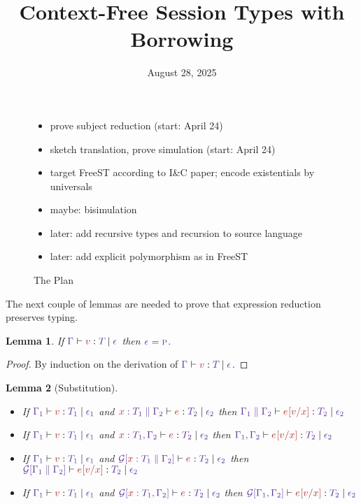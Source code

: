 \documentclass{article}
\title{Context-Free Session Types with Borrowing}
\date{August 28, 2025}
\newtheorem{lemma}{Lemma}
\begin{document}
\maketitle

\begin{figure}[tp]
  \begin{itemize}
  \item prove subject reduction (start: April 24)
  \item sketch translation, prove simulation (start: April 24)
  \item target FreeST according to I\&C paper; encode existentials by
    universals
  \item maybe: bisimulation
  \item later: add recursive types and recursion to source language
  \item later: add explicit polymorphism as in FreeST
  \end{itemize}
  \caption{The Plan}
  \label{fig:the-plan}
\end{figure}


The next couple of lemmas are needed to prove that
expression reduction preserves typing.

\begin{lemma}
  If $\HasType {\Ctx} {\V} {\T} {\Eff}$
  then $\Eff = \EffPure$.
\end{lemma}
\begin{proof}
  By induction on the derivation of $\HasType {\Ctx} {\V} {\T} {\Eff}$.
\end{proof}

\begin{lemma}[Substitution]\
  \begin{itemize}
    \item If $\HasType {\Ctx[1]} {\V} {\T[1]} {\Eff[1]}$ and
    $\HasType {\CtxExtUnord{\CtxVar x{\T[1]}}{\Ctx[2]}} {\E} {\T[2]} {\Eff[2]}$
    then 
    $\HasType {\CtxExtUnord{\Ctx[1]}{\Ctx[2]}} {\Subs\E\V x} {\T[2]} {\Eff[2]}$
    \item If $\HasType {\Ctx[1]} {\V} {\T[1]} {\Eff[1]}$ and
    $\HasType {\CtxExt{\CtxVar x{\T[1]}}{\Ctx[2]}} {\E} {\T[2]} {\Eff[2]}$
    then 
    $\HasType {\CtxExt{\Ctx[1]}{\Ctx[2]}} {\Subs\E\V x} {\T[2]} {\Eff[2]}$
    \item If $\HasType {\Ctx[1]} {\V} {\T[1]} {\Eff[1]}$
    and
    $\HasType
    {\CtxPattern{\CtxExtUnord{\CtxVar x{\T[1]}}{\Ctx[2]}}}
    {\E}
    {\T[2]}
    {\Eff[2]}$ then 
    $\HasType {\CtxPattern{\CtxExtUnord{\Ctx[1]}{\Ctx[2]}}} {\Subs\E\V x} {\T[2]} {\Eff[2]}$
  \item If $\HasType {\Ctx[1]} {\V} {\T[1]} {\Eff[1]}$
    and
    $\HasType
    {\CtxPattern{\CtxExt{\CtxVar x{\T[1]}}{\Ctx[2]}}}
    {\E}
    {\T[2]}
    {\Eff[2]}$ then 
    $\HasType {\CtxPattern{\CtxExt{\Ctx[1]}{\Ctx[2]}}} {\Subs\E\V x} {\T[2]} {\Eff[2]}$
  \end{itemize}
\end{lemma}
\end{document}
